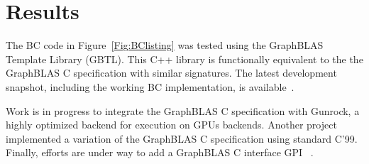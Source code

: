 \section{Results}
\label{sec:results}

The BC code in Figure~\ref{Fig:BClisting} 
was tested using the GraphBLAS Template Library (GBTL)\cite{gbtl-cuda16}. This 
C++ library is functionally equivalent to the the GraphBLAS C
specification with similar signatures.  The latest development snapshot, 
including the working BC implementation, is available~\cite{gbtl-github}. 

Work is in progress to integrate the GraphBLAS C specification 
with Gunrock\cite{topc17}, a highly optimized backend for execution 
on GPUs backends.  Another project~\cite{cook} implemented a variation
of the  GraphBLAS C specification using standard C'99.
Finally, efforts are  under way to add  a GraphBLAS C interface GPI~\cite{gpi2016} .

